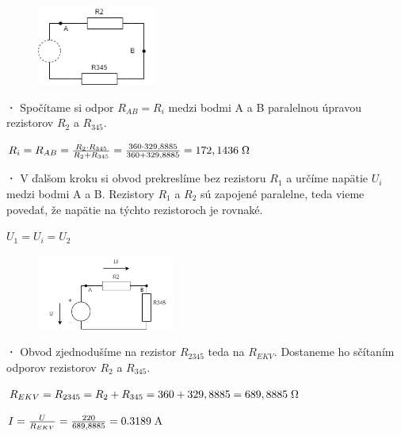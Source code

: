 \begin{figure}[h!]
    \centering
    \includegraphics[width=0.35\textwidth]{IEL-Project/pictures/Pr2_3.png}
\end{figure}

\newpage

\textbf{·}
Spočítame si odpor $R_{AB} = R_i$ medzi bodmi A a B paralelnou úpravou rezistorov $R_2$ a $R_345$.

\begin{center}
$R_i = R_{AB} = \frac{R_2 \cdot R_{345}}{R_2 + R_{345}} = \frac{360 \cdot 329,8885}{360 + 329,8885}= {172,1436} \hspace{0,1cm} \SI{}{\ohm}$
\end{center}

\textbf{·}
V ďalšom kroku si obvod prekreslíme bez rezistoru $R_1$ a určíme napätie $U_i$ medzi bodmi A a B. Rezistory $R_1$ a $R_2$ sú zapojené paralelne, teda vieme povedať, že napätie na týchto rezistoroch je rovnaké.

\begin{center}
    $U_1 = U_i = U_2$
\end{center}

\begin{figure}[h!]
    \centering
    \includegraphics[width=0.4\textwidth]{IEL-Project/pictures/Pr2_4.png}
\end{figure}

\textbf{·}
Obvod zjednodušíme na rezistor $R_{2345}$ teda na $R_{EKV}$. Dostaneme ho sčítaním odporov rezistorov $R_2$ a $R_{345}$.

\begin{center}
    $R_{EKV} = R_{2345} = R_2 + R_{345} = 360 + 329,8885 = {689,8885} \hspace{0,1cm} \SI{}{\ohm}$
\end{center}

\begin{center}
    $I = \frac{U}{R_{EKV}} = \frac{220}{689,8885} = {0.3189}\hspace{0,1cm} \SI{}{\ampere}$
\end{center}

